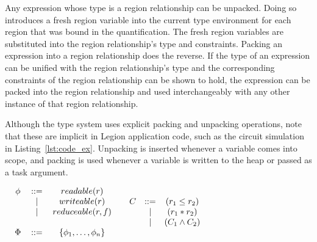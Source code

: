 Any expression whose type is a region relationship can be unpacked.
Doing so introduces a fresh region variable into the current type
environment for each region that was bound in the quantification.  The
fresh region variables are substituted into the region relationship's
type and constraints.  Packing an expression into a region
relationship does the reverse.  If the type of an expression can be
unified with the region relationship's type and the corresponding
constraints of the region relationship can be shown to hold, the
expression can be packed into the region relationship and used
interchangeably with any other instance of that region relationship.

Although the type system uses explicit packing and unpacking operations, 
note that these are implicit in Legion application code, such as the
circuit simulation in Listing~\ref{lst:code_ex}.  Unpacking is
inserted whenever a variable comes into scope, and packing is used
whenever a variable is written to the heap or passed as a task argument.


\begin{table}
\centering
{\small
\begin{math}
\begin{array}{cc}
\begin{tabular}{ccc}
$\phi$ & ::= & $readable(r)$ \\
  &$\mid$&$writeable(r)$ \\
  &$\mid$&$reduceable(r,f)$ \\
\\
$\Phi$ & ::= & $\{ \phi_1, \ldots, \phi_n \}$
\end{tabular}
&
\begin{array}{ccc}
C & ::= & (r_1 \rleq r_2) \\
  &\mid&(r_1 * r_2) \\
  &\mid&(C_1 \wedge C_2) \\
\end{array}
\end{array}
\end{math}
}
\label{tbl:priv_const}
\caption{Privileges and Constraints}
\end{table}

